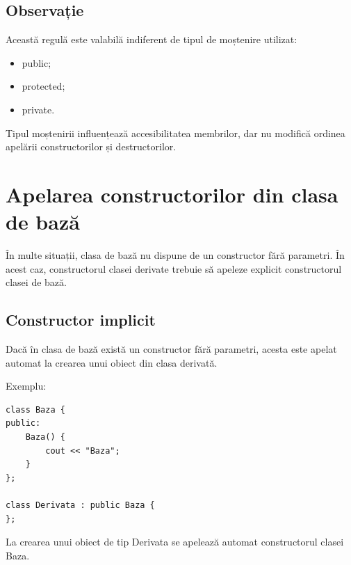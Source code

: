 \documentclass[12pt,a4paper]{article}
\begin{document}
\subsection{Observație}

Această regulă este valabilă indiferent de tipul de moștenire utilizat:

\begin{itemize}
\item public;
\item protected;
\item private.
\end{itemize}

Tipul moștenirii influențează accesibilitatea membrilor, dar nu modifică ordinea apelării constructorilor și destructorilor.























\section{Apelarea constructorilor din clasa de bază}

În multe situații, clasa de bază nu dispune de un constructor fără parametri. În acest caz, constructorul clasei derivate trebuie să apeleze explicit constructorul clasei de bază.

\subsection{Constructor implicit}

Dacă în clasa de bază există un constructor fără parametri, acesta este apelat automat la crearea unui obiect din clasa derivată.

Exemplu:

\begin{verbatim}
class Baza {
public:
    Baza() {
        cout << "Baza";
    }
};

class Derivata : public Baza {
};
\end{verbatim}

La crearea unui obiect de tip Derivata se apelează automat constructorul clasei Baza.
\end{document}
